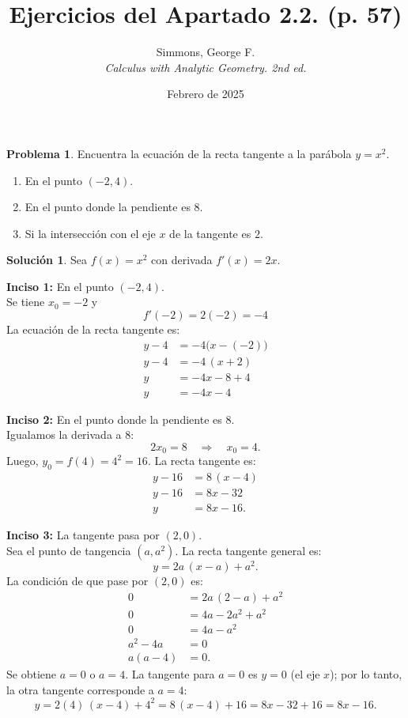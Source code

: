 \documentclass{article}
\theoremstyle{definition}
\newtheorem{problem}{Problema}
\newtheorem*{solution}{Solución}
\begin{document}
\title{Ejercicios del Apartado 2.2. (p. 57)}
\author{Simmons, George F. \\ \textit{Calculus with Analytic Geometry. 2nd ed.}}
\date{Febrero de 2025}
\maketitle

\begin{problem} 
Encuentra la ecuación de la recta tangente a la parábola \( y = x^2 \).
\begin{enumerate}
    \item En el punto \((-2,4)\).
    \item En el punto donde la pendiente es \(8\).
    \item Si la intersección con el eje \( x \) de la tangente es \(2\).
\end{enumerate}
\end{problem}

\begin{solution}
Sea \( f(x)=x^2 \) con derivada \( f'(x)=2x \).

\medskip

\textbf{Inciso 1:} En el punto \((-2,4)\).\\
Se tiene \( x_0=-2 \) y
\[
f'(-2)=2(-2)=-4
\]
La ecuación de la recta tangente es:
\begin{align*}
y-4 &= -4\bigl(x-(-2)\bigr)\\
y-4 &= -4\,(x+2)\\
y &= -4x - 8 + 4\\
y &= -4x - 4
\end{align*}

\textbf{Inciso 2:} En el punto donde la pendiente es \(8\).\\
Igualamos la derivada a \(8\):
\[
2x_0=8 \quad\Longrightarrow\quad x_0=4.
\]
Luego, \( y_0=f(4)=4^2=16 \). La recta tangente es:
\begin{align*}
y-16 &= 8\,(x-4)\\
y-16 &= 8x-32\\
y &= 8x - 16.
\end{align*}

\textbf{Inciso 3:} La tangente pasa por \((2,0)\).\\
Sea el punto de tangencia \((a, a^2)\). La recta tangente general es:
\[
y=2a\,(x-a)+a^2.
\]
La condición de que pase por \((2,0)\) es:
\begin{align*}
0 &= 2a\,(2-a)+a^2\\
0 &= 4a - 2a^2 + a^2\\
0 &= 4a - a^2\\
a^2-4a &= 0\\
a(a-4)&=0.
\end{align*}
Se obtiene \( a=0 \) o \( a=4 \). La tangente para \( a=0 \) es \( y=0 \) (el eje \( x \)); por lo tanto, la otra tangente corresponde a \( a=4 \):
\[
y=2(4)\,(x-4)+4^2=8\,(x-4)+16=8x-32+16=8x-16.
\]
\end{solution}
\end{document}
